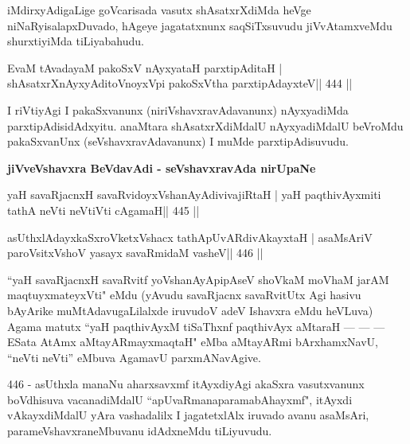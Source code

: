 \begin{artha}
iMdirxyAdigaLige goVcarisada vasutx shAsatxrXdiMda heVge niNaRyisalapxDuvado, hAgeye jagatatxnunx saqSiTxsuvudu jiVvAtamxveMdu shurxtiyiMda tiLiyabahudu.
\end{artha}


\begin{shl}
EvaM tAvadayaM pakoSxV nAyxyataH parxtipAditaH |
shAsatxrXnAyxyAditoV\s noyxV\s pi pakoSxV\s tha parxtipAdayxteV\hfill || 444 ||
\end{shl}

\begin{artha}
I riVtiyAgi I pakaSxvanunx (niriVshavxravAdavanunx) nAyxyadiMda parxtipAdisidAdxyitu. anaMtara shAsatxrXdiMdalU nAyxyadiMdalU beVroMdu pakaSxvanUnx (seVshavxravAdavanunx) I muMde parxtipAdisuvudu.
\end{artha}

\medskip
\centerline{\Large{\textbf{jiVveVshavxra BeVdavAdi - seVshavxravAda nirUpaNe}}}

\medskip


\begin{shl}
yaH savaRjacnxH savaRvidoyxV\s shanAyAdivivajiRtaH |
yaH paqthivAyxmiti tathA neVti neVtiVti cA\s\s gamaH\hfill || 445 ||
\end{shl}

\begin{shl}
asUthxlAdayxkaSxroVketxVshacx tathA\s pUvARdivAkayxtaH |
asaMsAriV paroV\s sitxVshoV yasayx savaRmidaM vasheV\hfill || 446 ||
\end{shl}

\begin{artha}
``yaH savaRjacnxH savaRvitf yoV\s shanAyApipAseV shoVkaM moVhaM
  jarAM maqtuyxmateyxVti" eMdu (yAvudu savaRjacnx savaRvitUtx Agi
  hasivu bAyArike muMtAdavugaLilalxde iruvudoV adeV Ishavxra eMdu
  heVLuva) Agama matutx ``yaH paqthivAyxM tiSaThxnf paqthivAyx aMtaraH
   {\rm ---}   {\rm ---}   {\rm ---}  ESata AtAmx aMtayARmayxmaqtaH" eMba
  aMtayARmi bArxhamxNavU, ``neVti neVti'' eMbuva AgamavU
  parxmANavAgive. 
  
  446 - asUthxla manaNu aharxsavxmf itAyxdiyAgi akaSxra
  vasutxvanunx boVdhisuva vacanadiMdalU ``apUvaRmanaparamabAhayxmf", 
  itAyxdi vAkayxdiMdalU yAra vashadalilx I jagatetxlAlx
  iruvado avanu asaMsAri, parameVshavxraneMbuvanu idAdxneMdu tiLiyuvudu.
\end{artha}

